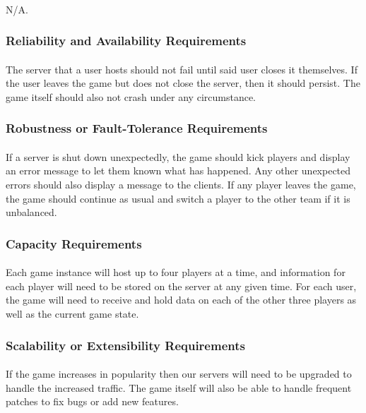 \documentclass[12pt, titlepage]{article}
\begin{document}
\paragraph{}N/A.
\subsubsection{Reliability and Availability Requirements}
\paragraph{}The server that a user hosts should not fail until said user closes it themselves. If the user leaves the game but does not close the server, then it should persist. The game itself should also not crash under any circumstance.
\subsubsection{Robustness or Fault-Tolerance Requirements}
\paragraph{}If a server is shut down unexpectedly, the game should kick players and display an error message to let them known what has happened. Any other unexpected errors should also display a message to the clients. If any player leaves the game, the game should continue as usual and switch a player to the other team if it is unbalanced.  
\subsubsection{Capacity Requirements}
\paragraph{}Each game instance will host up to four players at a time, and information for each player will need to be stored on the server at any given time. For each user, the game will need to receive and hold data on each of the other three players as well as the current game state. 
\subsubsection{Scalability or Extensibility Requirements}
\paragraph{}If the game increases in popularity then our servers will need to be upgraded to handle the increased traffic. The game itself will also be able to handle frequent patches to fix bugs or add new features. 
\end{document}
